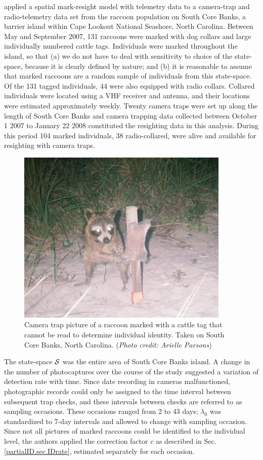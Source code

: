 \citet{sollmann_etal:2012ecol} applied a spatial mark-resight model
with telemetry data to a camera-trap and radio-telemetry data set from
the raccoon population on South Core Banks, a barrier island within
Cape Lookout National Seashore, North Carolina. Between May and
September 2007, 131 raccoons were marked with dog collars and large
individually numbered cattle tags. Individuals were marked throughout
the island, so that (a) we do not have to deal with sensitivity to
choice of the state-space, because it is clearly defined by nature;
and (b) it is reasonable to assume that marked raccoons are a random
sample of individuals from this state-space.  Of the 131 tagged
individuals, 44 were also equipped with radio collars. Collared
individuals were located using a VHF receiver and antenna, and their
locations were estimated approximately weekly. Twenty camera traps
were set up along the length of South Core Banks and camera trapping
data collected between October 1 2007 to January 22 2008 constituted
the resighting data in this analysis. During this period 104 marked
individuals, 38 radio-collared, were alive and available for
resighting with camera traps.

\begin{figure}[ht]
  \centering
  \includegraphics[width=4in]{Ch19-PartialID/figs/Raccoon_pic.png}
  \caption{Camera trap picture of a raccoon marked with a cattle tag that cannot be read to determine individual identity. Taken on South Core Banks, North Carolina.
({\it Photo credit: Arielle Parsons})}
  \label{partialID.fig.raccoon}
\end{figure}

The state-space ${\cal S}$ was the entire area of South Core Banks
island. A change in the number of photocaptures over the course of the
study suggested a variation of detection rate with time. Since date
recording in cameras malfunctioned, photographic records could only be
assigned to the time interval between subsequent trap checks, and
these intervals between checks are referred to as sampling
occasions. These occasions ranged from 2 to 43 days; $\lambda_0$ was
standardized to 7-day intervals and allowed to change with sampling
occasion. Since not all pictures of marked raccoons could be
identified to the individual level, the authors applied the correction
factor $c$ as described in Sec. \ref{partialID.sec.IDrate}, estimated
separately for each occasion.

